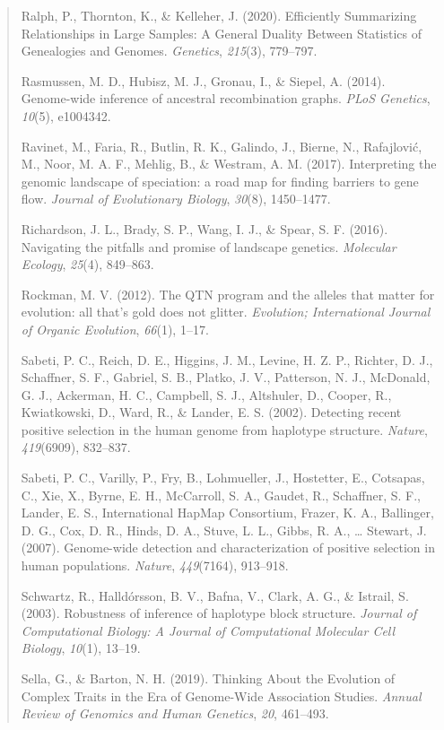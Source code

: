 \documentclass[
]{article}
\begin{document}
\begin{quote}
Ralph, P., Thornton, K., \& Kelleher, J. (2020). Efficiently Summarizing
Relationships in Large Samples: A General Duality Between Statistics of
Genealogies and Genomes. \emph{Genetics}, \emph{215}(3), 779--797.

Rasmussen, M. D., Hubisz, M. J., Gronau, I., \& Siepel, A. (2014).
Genome-wide inference of ancestral recombination graphs. \emph{PLoS
Genetics}, \emph{10}(5), e1004342.

Ravinet, M., Faria, R., Butlin, R. K., Galindo, J., Bierne, N.,
Rafajlović, M., Noor, M. A. F., Mehlig, B., \& Westram, A. M. (2017).
Interpreting the genomic landscape of speciation: a road map for finding
barriers to gene flow. \emph{Journal of Evolutionary Biology},
\emph{30}(8), 1450--1477.

Richardson, J. L., Brady, S. P., Wang, I. J., \& Spear, S. F. (2016).
Navigating the pitfalls and promise of landscape genetics.
\emph{Molecular Ecology}, \emph{25}(4), 849--863.

Rockman, M. V. (2012). The QTN program and the alleles that matter for
evolution: all that's gold does not glitter. \emph{Evolution;
International Journal of Organic Evolution}, \emph{66}(1), 1--17.

Sabeti, P. C., Reich, D. E., Higgins, J. M., Levine, H. Z. P., Richter,
D. J., Schaffner, S. F., Gabriel, S. B., Platko, J. V., Patterson, N.
J., McDonald, G. J., Ackerman, H. C., Campbell, S. J., Altshuler, D.,
Cooper, R., Kwiatkowski, D., Ward, R., \& Lander, E. S. (2002).
Detecting recent positive selection in the human genome from haplotype
structure. \emph{Nature}, \emph{419}(6909), 832--837.

Sabeti, P. C., Varilly, P., Fry, B., Lohmueller, J., Hostetter, E.,
Cotsapas, C., Xie, X., Byrne, E. H., McCarroll, S. A., Gaudet, R.,
Schaffner, S. F., Lander, E. S., International HapMap Consortium,
Frazer, K. A., Ballinger, D. G., Cox, D. R., Hinds, D. A., Stuve, L. L.,
Gibbs, R. A., \ldots{} Stewart, J. (2007). Genome-wide detection and
characterization of positive selection in human populations.
\emph{Nature}, \emph{449}(7164), 913--918.

Schwartz, R., Halldórsson, B. V., Bafna, V., Clark, A. G., \& Istrail,
S. (2003). Robustness of inference of haplotype block structure.
\emph{Journal of Computational Biology: A Journal of Computational
Molecular Cell Biology}, \emph{10}(1), 13--19.

Sella, G., \& Barton, N. H. (2019). Thinking About the Evolution of
Complex Traits in the Era of Genome-Wide Association Studies.
\emph{Annual Review of Genomics and Human Genetics}, \emph{20},
461--493.


\end{quote}
\end{document}
